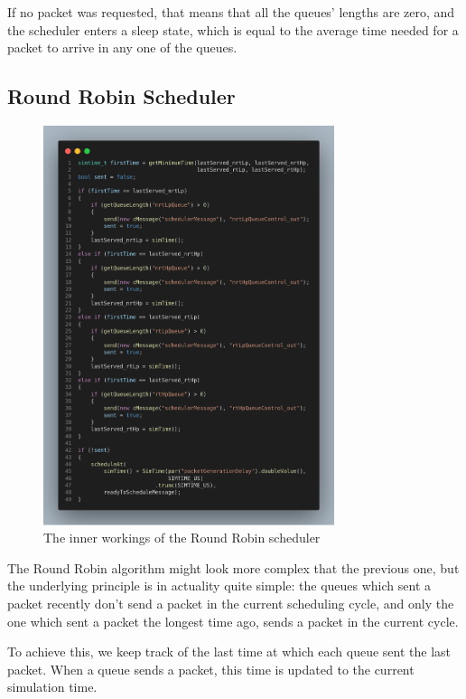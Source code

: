 \documentclass[12pt]{article}
\begin{document}
        If no packet was requested, that means that all the queues' lengths are zero, and the scheduler enters a sleep state, which is equal to the average time needed for a packet to arrive in any one of the queues.

        \subsection{Round Robin Scheduler}
        \begin{figure}[htbp!]
            \centering
            \includegraphics[width=0.76\textwidth]{images/rr_code.png}
            \caption{The inner workings of the Round Robin scheduler}
        \end{figure}
        \pagebreak
        The Round Robin algorithm might look more complex that the previous one, but the underlying principle is in actuality quite simple: the queues which sent a packet recently don't send a packet in the current scheduling cycle, and only the one which sent a packet the longest time ago, sends a packet in the current cycle.
        
        To achieve this, we keep track of the last time at which each queue sent the last packet. When a queue sends a packet, this time is updated to the current simulation time.
\end{document}
